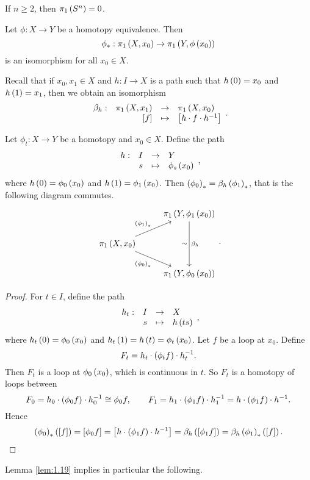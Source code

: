 \begin{proposition}
If $ n \ge 2 $, then $ \pi_1\left( S^n \right) = 0 $.
\end{proposition}


\begin{proposition}
\label{prop:1.18}
Let $ \phi : X \to Y $ be a homotopy equivalence. Then
$$ \phi_* : \pi_1\left( X, x_0 \right) \to \pi_1\left( Y, \phi\left( x_0 \right) \right) $$
is an isomorphism for all $ x_0 \in X $.
\end{proposition}

Recall that if $ x_0, x_1 \in X $ and $ h : I \to X $ is a path such that $ h\left( 0 \right) = x_0 $ and $ h\left( 1 \right) = x_1 $, then we obtain an isomorphism
$$ \function[\beta_h]{\pi_1\rb{X, x_1}}{\pi_1\rb{X, x_0}}{\sb{f}}{\sb{h \cdot f \cdot h^{-1}}}. $$

\begin{lemma}
\label{lem:1.19}
Let $ \phi_t : X \to Y $ be a homotopy and $ x_0 \in X $. Define the path
$$ \function[h]{I}{Y}{s}{\phi_s\rb{x_0}}, $$
where $ h\left( 0 \right) = \phi_0\left( x_0 \right) $ and $ h\left( 1 \right) = \phi_1\left( x_0 \right) $. Then $ \left( \phi_0 \right)_* = \beta_h\left( \phi_1 \right)_* $, that is the following diagram commutes.
$$
\begin{tikzcd}
& \pi_1\rb{Y, \phi_1\rb{x_0}} \arrow{dd}{\beta_h}[swap]{\sim} \\
\pi_1\rb{X, x_0} \arrow{ur}{\rb{\phi_1}_*} \arrow[swap]{dr}{\rb{\phi_0}_*} & \\
& \pi_1\rb{Y, \phi_0\rb{x_0}}
\end{tikzcd}.
$$
\end{lemma}

\begin{proof}
For $ t \in I $, define the path
$$ \function[h_t]{I}{X}{s}{h\rb{ts}}, $$
where $ h_t\left( 0 \right) = \phi_0\left( x_0 \right) $ and $ h_t\left( 1 \right) = h\left( t \right) = \phi_t\left( x_0 \right) $. Let $ f $ be a loop at $ x_0 $. Define
$$ F_t = h_t \cdot \left( \phi_tf \right) \cdot h_t^{-1}. $$
Then $ F_t $ is a loop at $ \phi_0\left( x_0 \right) $, which is continuous in $ t $. So $ F_t $ is a homotopy of loops between
$$ F_0 = h_0 \cdot \left( \phi_0f \right) \cdot h_0^{-1} \cong \phi_0f, \qquad F_1 = h_1 \cdot \left( \phi_1f \right) \cdot h_1^{-1} = h \cdot \left( \phi_1f \right) \cdot h^{-1}. $$
Hence
$$ \left( \phi_0 \right)_*\left( \left[ f \right] \right) = \left[ \phi_0f \right] = \left[ h \cdot \left( \phi_1f \right) \cdot h^{-1} \right] = \beta_h\left( \left[ \phi_1f \right] \right) = \beta_h\left( \phi_1 \right)_*\left( \left[ f \right] \right). $$
\end{proof}

Lemma \ref{lem:1.19} implies in particular the following.

